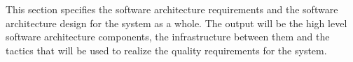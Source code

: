 This section specifies the software architecture requirements and the software architecture design
for the system as a whole. The output will be the high level software architecture components, the infrastructure between them and the tactics that will be used to realize the quality requirements for the system. 